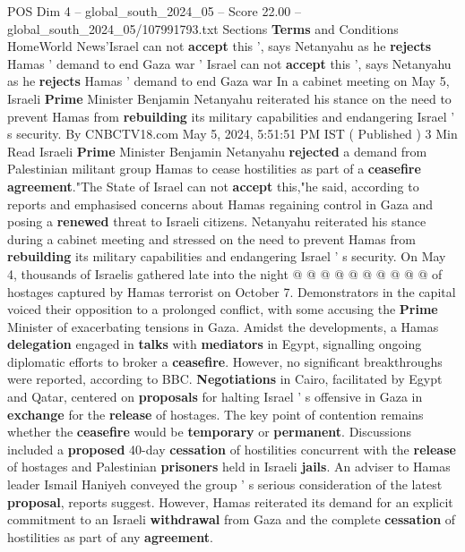 \begin{textsample}{POS Dim 4 – global\_south\_2024\_05 – Score 22.00 – global\_south\_2024\_05/107991793.txt}  \label{ex:f4_pos_210}
Sections \textbf{Terms} and Conditions HomeWorld News'Israel can not \textbf{accept} this ', says Netanyahu as he \textbf{rejects} Hamas ' demand to end Gaza war ' Israel can not \textbf{accept} this ', says Netanyahu as he \textbf{rejects} Hamas ' demand to end Gaza war In a cabinet meeting on May 5, Israeli \textbf{Prime} Minister Benjamin Netanyahu reiterated his stance on the need to prevent Hamas from \textbf{rebuilding} its military capabilities and endangering Israel ' s security.
By CNBCTV18.com May 5, 2024, 5:51:51 PM IST ( Published ) 3 Min Read Israeli \textbf{Prime} Minister Benjamin Netanyahu \textbf{rejected} a demand from Palestinian militant group Hamas to cease hostilities as part of a \textbf{ceasefire} \textbf{agreement}."The State of Israel can not \textbf{accept} this,"he said, according to reports and emphasised concerns about Hamas regaining control in Gaza and posing a \textbf{renewed} threat to Israeli citizens.
Netanyahu reiterated his stance during a cabinet meeting and stressed on the need to prevent Hamas from \textbf{rebuilding} its military capabilities and endangering Israel ' s security.
On May 4, thousands of Israelis gathered late into the night @ @ @ @ @ @ @ @ @ @ of hostages captured by Hamas terrorist on October 7.
Demonstrators in the capital voiced their opposition to a prolonged conflict, with some accusing the \textbf{Prime} Minister of exacerbating tensions in Gaza.
Amidst the developments, a Hamas \textbf{delegation} engaged in \textbf{talks} with \textbf{mediators} in Egypt, signalling ongoing diplomatic efforts to broker a \textbf{ceasefire}.
However, no significant breakthroughs were reported, according to BBC. \textbf{Negotiations} in Cairo, facilitated by Egypt and Qatar, centered on \textbf{proposals} for halting Israel ' s offensive in Gaza in \textbf{exchange} for the \textbf{release} of hostages.
The key point of contention remains whether the \textbf{ceasefire} would be \textbf{temporary} or \textbf{permanent}.
Discussions included a \textbf{proposed} 40-day \textbf{cessation} of hostilities concurrent with the \textbf{release} of hostages and Palestinian \textbf{prisoners} held in Israeli \textbf{jails}.
An adviser to Hamas leader Ismail Haniyeh conveyed the group ' s serious consideration of the latest \textbf{proposal}, reports suggest.
However, Hamas reiterated its demand for an explicit commitment to an Israeli \textbf{withdrawal} from Gaza and the complete \textbf{cessation} of hostilities as part of any \textbf{agreement}.

\end{textsample}
